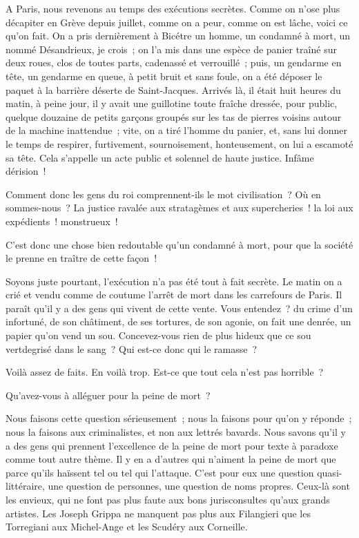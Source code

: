 \documentclass[french,twoside]{book} %
\begin{document}
A Paris, nous revenons au temps des exécutions secrètes. Comme on n’ose plus décapiter en Grève depuis juillet, comme on a peur, comme on est lâche, voici ce qu’on fait. On a pris dernièrement à Bicétre un homme, un condamné à mort, un nommé Désandrieux, je crois ; on l’a mis dans une espèce de panier traîné sur deux roues, clos de toutes parts, cadenassé et verrouillé ; puis, un gendarme en tête, un gendarme en queue, à petit bruit et sans foule, on a été déposer le paquet à la barrière déserte de Saint-Jacques. Arrivés là, il était huit heures du matin, à peine jour, il y avait une guillotine toute fraîche dressée, pour public, quelque douzaine de petits garçons groupés sur les tas de pierres voisins autour de la machine inattendue ; vite, on a tiré l’homme du panier, et, sans lui donner le temps de respirer, furtivement, sournoisement, honteusement, on lui a escamoté sa tête. Cela s’appelle un acte public et solennel de haute justice. Infâme dérision !\par
Comment donc les gens du roi comprennent-ils le mot civilisation ? Où en sommes-nous ? La justice ravalée aux  stratagèmes et aux supercheries ! la loi aux expédients ! monstrueux !\par
C’est donc une chose bien redoutable qu’un condamné à mort, pour que la société le prenne en traître de cette façon !\par
Soyons juste pourtant, l’exécution n’a pas été tout à fait secrète. Le matin on a crié et vendu comme de coutume l’arrêt de mort dans les carrefours de Paris. Il paraît qu’il y a des gens qui vivent de cette vente. Vous entendez ? du crime d’un infortuné, de son châtiment, de ses tortures, de son agonie, on fait une denrée, un papier qu’on vend un sou. Concevez-vous rien de plus hideux que ce sou vertdegrisé dans le sang ? Qui est-ce donc qui le ramasse ?\par
Voilà assez de faits. En voilà trop. Est-ce que tout cela n’est pas horrible ?\par
Qu’avez-vous à alléguer pour la peine de mort ?\par
Nous faisons cette question sérieusement ; nous la faisons pour qu’on y réponde ; nous la faisons aux criminalistes, et non aux lettrés bavards. Nous savons qu’il y a des gens qui prennent l’excellence de la peine de mort pour texte à paradoxe comme tout autre thème. Il y en a d’autres qui n’aiment la peine de mort que parce qu’ils haïssent tel ou tel qui l’attaque. C’est pour eux une question quasi-littéraire, une question de personnes, une question de noms propres. Ceux-là sont les envieux, qui ne font pas plus faute aux bons jurisconsultes qu’aux grands artistes. Les Joseph Grippa ne manquent pas plus aux Filangieri que les Torregiani aux Michel-Ange et les Scudéry aux Corneille.\par
\end{document}
